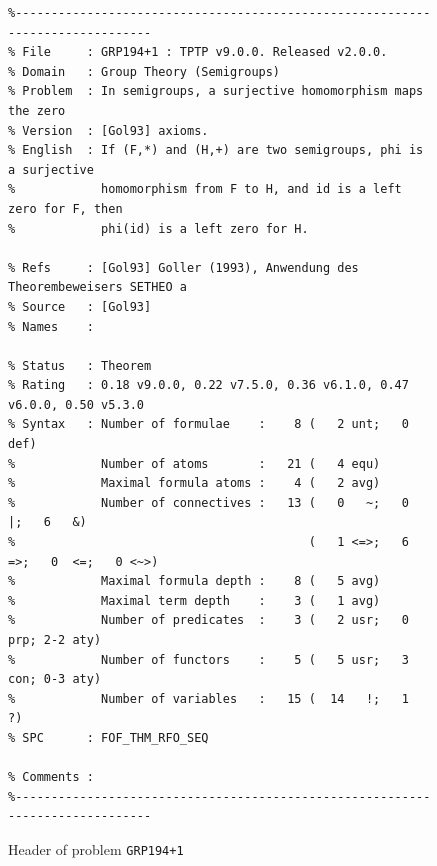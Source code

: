 \documentclass[runningheads]{llncs}
\begin{document}
\begin{figure}[htb]
\centering
{\scriptsize
{\setlength{\baselineskip}{2.5mm}
\begin{verbatim}
%------------------------------------------------------------------------------
% File     : GRP194+1 : TPTP v9.0.0. Released v2.0.0.
% Domain   : Group Theory (Semigroups)
% Problem  : In semigroups, a surjective homomorphism maps the zero
% Version  : [Gol93] axioms.
% English  : If (F,*) and (H,+) are two semigroups, phi is a surjective
%            homomorphism from F to H, and id is a left zero for F, then 
%            phi(id) is a left zero for H.

% Refs     : [Gol93] Goller (1993), Anwendung des Theorembeweisers SETHEO a
% Source   : [Gol93]
% Names    :

% Status   : Theorem
% Rating   : 0.18 v9.0.0, 0.22 v7.5.0, 0.36 v6.1.0, 0.47 v6.0.0, 0.50 v5.3.0
% Syntax   : Number of formulae    :    8 (   2 unt;   0 def)
%            Number of atoms       :   21 (   4 equ)
%            Maximal formula atoms :    4 (   2 avg)
%            Number of connectives :   13 (   0   ~;   0   |;   6   &)
%                                         (   1 <=>;   6  =>;   0  <=;   0 <~>)
%            Maximal formula depth :    8 (   5 avg)
%            Maximal term depth    :    3 (   1 avg)
%            Number of predicates  :    3 (   2 usr;   0 prp; 2-2 aty)
%            Number of functors    :    5 (   5 usr;   3 con; 0-3 aty)
%            Number of variables   :   15 (  14   !;   1   ?)
% SPC      : FOF_THM_RFO_SEQ

% Comments :
%------------------------------------------------------------------------------
\end{verbatim}
}}
\caption{Header of problem {\tt GRP194+1}}
\label{ExampleHeader}
\end{figure}
\end{document}

